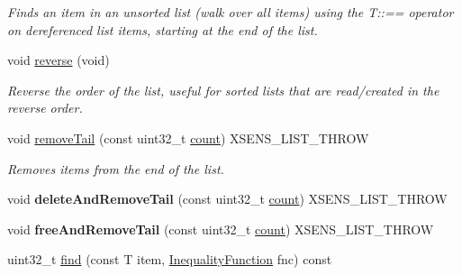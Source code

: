 \begin{DoxyCompactItemize}
\begin{DoxyCompactList}\small\item\em \-Finds an item in an unsorted list (walk over all items) using the \-T\-:\-:== operator on dereferenced list items, starting at the end of the list. \end{DoxyCompactList}\item 
\hypertarget{classxsens_1_1List_a3aaa840b803e7b8f1a8f60180ac0c749}{void \hyperlink{classxsens_1_1List_a3aaa840b803e7b8f1a8f60180ac0c749}{reverse} (void)}\label{classxsens_1_1List_a3aaa840b803e7b8f1a8f60180ac0c749}

\begin{DoxyCompactList}\small\item\em \-Reverse the order of the list, useful for sorted lists that are read/created in the reverse order. \end{DoxyCompactList}\item 
\hypertarget{classxsens_1_1List_a9f6705eea5d8a47b25dbf6f1057e9a76}{void \hyperlink{classxsens_1_1List_a9f6705eea5d8a47b25dbf6f1057e9a76}{remove\-Tail} (const uint32\-\_\-t \hyperlink{classxsens_1_1List_a430ba09ad069373d9e92b0b92b10546b}{count}) \-X\-S\-E\-N\-S\-\_\-\-L\-I\-S\-T\-\_\-\-T\-H\-R\-O\-W}\label{classxsens_1_1List_a9f6705eea5d8a47b25dbf6f1057e9a76}

\begin{DoxyCompactList}\small\item\em \-Removes items from the end of the list. \end{DoxyCompactList}\item 
\hypertarget{classxsens_1_1List_a3b383f7ea4b981f7ed3c8ce7b9940fb5}{void {\bfseries delete\-And\-Remove\-Tail} (const uint32\-\_\-t \hyperlink{classxsens_1_1List_a430ba09ad069373d9e92b0b92b10546b}{count}) \-X\-S\-E\-N\-S\-\_\-\-L\-I\-S\-T\-\_\-\-T\-H\-R\-O\-W}\label{classxsens_1_1List_a3b383f7ea4b981f7ed3c8ce7b9940fb5}

\item 
\hypertarget{classxsens_1_1List_adc367a8bde5fd070f881831008283865}{void {\bfseries free\-And\-Remove\-Tail} (const uint32\-\_\-t \hyperlink{classxsens_1_1List_a430ba09ad069373d9e92b0b92b10546b}{count}) \-X\-S\-E\-N\-S\-\_\-\-L\-I\-S\-T\-\_\-\-T\-H\-R\-O\-W}\label{classxsens_1_1List_adc367a8bde5fd070f881831008283865}

\item 
\hypertarget{classxsens_1_1List_a0972fd678443ac8954769dee84c3979f}{uint32\-\_\-t \hyperlink{classxsens_1_1List_a0972fd678443ac8954769dee84c3979f}{find} (const \-T item, \hyperlink{classxsens_1_1List_a83d215d6221ce3aa3a0936d3bc7af86b}{\-Inequality\-Function} fnc) const }\label{classxsens_1_1List_a0972fd678443ac8954769dee84c3979f}


\end{DoxyCompactItemize}
